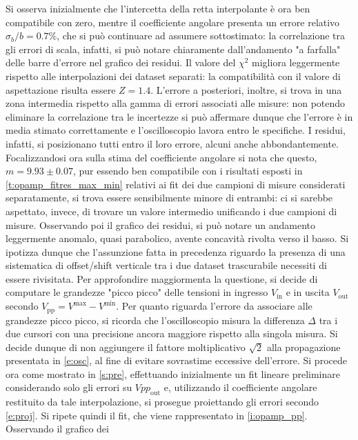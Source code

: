 \documentclass[a4paper,11pt]{article} %
\begin{document}
\noindent Si osserva inizialmente che l'intercetta della retta interpolante è ora ben compatibile con zero, mentre il
coefficiente angolare presenta un errore relativo $\sigma_{b}/b=0.7\%$, che si può continuare ad assumere sottostimato:
la correlazione tra gli errori di scala, infatti, si può notare chiaramente dall'andamento "a farfalla" delle barre
d'errore nel grafico dei residui. Il valore del $\chi^2$ migliora leggermente rispetto alle interpolazioni dei dataset
separati: la compatibilità con il valore di aspettazione risulta essere $Z=1.4$. L'errore a posteriori, inoltre, si
trova in una zona intermedia rispetto alla gamma di errori associati alle misure: non potendo eliminare la correlazione
tra le incertezze si può affermare dunque che l'errore è in media stimato correttamente e l'oscilloscopio lavora entro
le specifiche. I residui, infatti, si posizionano tutti entro il loro errore, alcuni anche abbondantemente.
Focalizzandosi ora sulla stima del coefficiente angolare si nota che questo, $m=9.93\pm 0.07$, pur essendo ben
compatibile con i risultati esposti in  \autoref{t:opamp_fitres_max_min} relativi ai fit dei due campioni di misure
considerati separatamente, si trova essere sensibilmente minore di entrambi: ci si sarebbe aspettato, invece, di trovare
un valore intermedio unificando i due campioni di misure. Osservando poi il grafico dei residui, si può notare un
andamento leggermente anomalo, quasi parabolico, avente concavità rivolta verso il basso. Si ipotizza dunque che
l'assunzione fatta in precedenza riguardo la presenza di una sistematica di offset/shift verticale tra i due dataset
trascurabile necessiti di essere rivisitata. Per approfondire maggiormenta la questione, si decide di computare le
grandezze "picco picco" delle tensioni in ingresso $V_{\text{in}}$ e in uscita $V_{\text{out}}$ secondo
$V_{\text{pp}}=V^{\text{max}}-V^{\text{min}}$. Per quanto riguarda l'errore da associare alle grandezze picco picco, si
ricorda che l'oscilloscopio misura la differenza $\Delta$ tra i due cursori con una precisione ancora maggiore rispetto
alla singola misura. Si decide dunque di non aggiungere il fattore moltiplicativo $\sqrt{2}$ alla propagazione
presentata in  \autoref{e:osc}, al fine di evitare sovrastime eccessive dell'errore. Si procede ora come mostrato in
\autoref{s:pre}, effettuando inizialmente un fit lineare preliminare considerando solo gli errori su $Vpp_{\text{out}}$
e, utilizzando il coefficiente angolare restituito da tale interpolazione, si prosegue proiettando gli errori secondo
\autoref{e:proj}. Si ripete quindi il fit, che viene rappresentato in \autoref{i:opamp_pp}. Osservando il grafico dei
\end{document}
